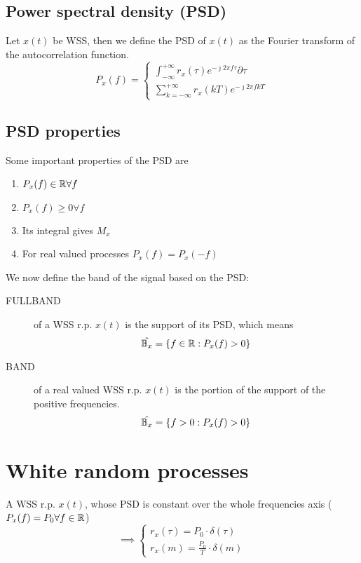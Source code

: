 \subsection{Power spectral density (PSD)}
Let $x(t)$ be WSS, then we define the PSD of $x(t)$ as the Fourier transform of the autocorrelation function.
\begin{equation}P_x(f)=
  \begin{cases}
    \int_{-\infty}^{+\infty} r_x(\tau)e^{-\jmath 2\pi f \tau} \partial \tau \\
    \sum\limits_{k=-\infty}^{+\infty} r_x(k T)e^{-\jmath 2\pi f k T}
  \end{cases}
\end{equation}
\subsection{PSD properties}
Some important properties of the PSD are
\begin{enumerate}
  \item $P_x(f)\in \mathbb{R} \forall f$
  \item $P_x(f)\ge 0 \forall f$
  \item Its integral gives $M_x$
  \item For real valued processes $P_x(f)=P_x(-f)$
\end{enumerate}


We now define the band of the signal based on the PSD:

\begin{description}
  \item[FULLBAND] of a WSS r.p. $x(t)$ is the support of its PSD, which means
  $$\hat{\mathbb{B}_x} = \lbrace f \in \mathbb{R} : P_x(f)>0\rbrace$$
  \item[BAND] of a real valued WSS r.p. $x(t)$ is the portion of the support of the positive frequencies.
  $$\hat{\mathbb{B}_x} = \lbrace f>0 : P_x(f)>0\rbrace$$
\end{description}

\section{White random processes}
A WSS r.p. $x(t)$, whose PSD is constant over the whole frequencies axis ($P_x(f) = P_0 \forall f \in \mathbb{R}$)
\begin{equation}
  \implies
  \begin{cases}
    r_x(\tau) = P_0 \cdot \delta(\tau) \\
    r_x(m) = \frac{P_0}{T} \cdot \delta(m)
  \end{cases}
\end{equation}
